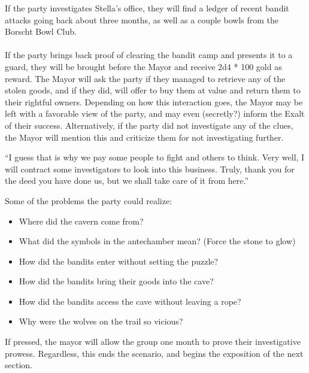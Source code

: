 If the party investigates Stella's office, they will find a ledger of recent bandit attacks going back about three months, as well as a couple bowls from the Borscht Bowl Club.\\
\\
If the party brings back proof of clearing the bandit camp and presents it to a guard, they will be brought before the Mayor and receive 2d4 * 100 gold as reward. The Mayor will ask the party if they managed to retrieve any of the stolen goods, and if they did, will offer to buy them at value and return them to their rightful owners. Depending on how this interaction goes, the Mayor may be left with a favorable view of the party, and may even (secretly?) inform the Exalt of their success. Alternatively, if the party did not investigate any of the clues, the Mayor will mention this and criticize them for not investigating further.
\begin{center}
``I guess that is why we pay some people to fight and others to think. Very well, I will contract some investigators to look into this business. Truly, thank you for the deed you have done us, but we shall take care of it from here.''
\end{center}
Some of the problems the party could realize:
\begin{itemize}
\item Where did the cavern come from?
\item What did the symbols in the antechamber mean? (Force the stone to glow)
\item How did the bandits enter without setting the puzzle?
\item How did the bandits bring their goods into the cave?
\item How did the bandits access the cave without leaving a rope?
\item Why were the wolves on the trail so vicious?
\end{itemize}
If pressed, the mayor will allow the group one month to prove their investigative prowess. Regardless, this ends the scenario, and begins the exposition of the next section.